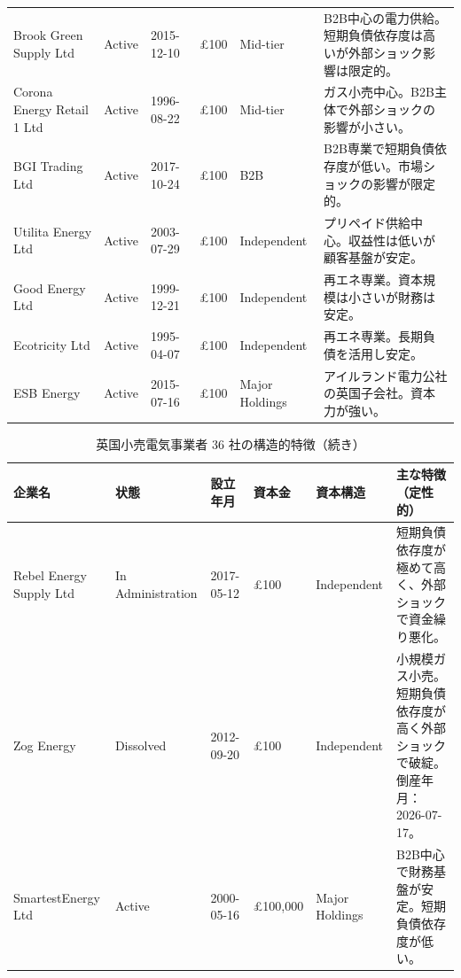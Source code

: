 \begin{landscape}
\begin{table}[H]
\begin{tabular}{p{3.2cm}p{1.4cm}p{1.8cm}p{1.8cm}p{2.2cm}p{10cm}}
Brook Green Supply Ltd & Active & 2015-12-10 & £100 & Mid-tier &
B2B中心の電力供給。短期負債依存度は高いが外部ショック影響は限定的。 \\

Corona Energy Retail 1 Ltd & Active & 1996-08-22 & £100 & Mid-tier &
ガス小売中心。B2B主体で外部ショックの影響が小さい。 \\

BGI Trading Ltd & Active & 2017-10-24 & £100 & B2B &
B2B専業で短期負債依存度が低い。市場ショックの影響が限定的。 \\

Utilita Energy Ltd & Active & 2003-07-29 & £100 & Independent &
プリペイド供給中心。収益性は低いが顧客基盤が安定。 \\

Good Energy Ltd & Active & 1999-12-21 & £100 & Independent &
再エネ専業。資本規模は小さいが財務は安定。 \\

Ecotricity Ltd & Active & 1995-04-07 & £100 & Independent &
再エネ専業。長期負債を活用し安定。 \\

ESB Energy & Active & 2015-07-16 & £100 & Major Holdings &
アイルランド電力公社の英国子会社。資本力が強い。 \\

\bottomrule
\end{tabular}
\end{table}

\begin{table}[H]
\centering
\footnotesize
\caption{英国小売電気事業者 36 社の構造的特徴（続き）}

\begin{tabular}{p{3.2cm}p{1.4cm}p{1.8cm}p{1.8cm}p{2.2cm}p{10cm}}
\toprule
企業名 & 状態 & 設立年月 & 資本金 & 資本構造 & 主な特徴（定性的） \\
\midrule

Rebel Energy Supply Ltd & In Administration & 2017-05-12 & £100 & Independent &
短期負債依存度が極めて高く、外部ショックで資金繰り悪化。 \\

Zog Energy & Dissolved & 2012-09-20 & £100 & Independent &
小規模ガス小売。短期負債依存度が高く外部ショックで破綻。倒産年月：2026-07-17。 \\

SmartestEnergy Ltd & Active & 2000-05-16 & £100,000 & Major Holdings &
B2B中心で財務基盤が安定。短期負債依存度が低い。 \\


\end{tabular}
\end{table}
\end{landscape}
